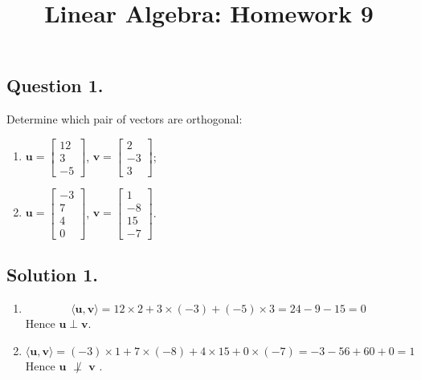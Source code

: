 \documentclass{article}
\title{Linear Algebra: Homework 9}
\begin{document}
\maketitle
\subsection*{Question 1.}
Determine which pair of vectors are orthogonal:
\begin{enumerate}[label=(\arabic*)]
    \item $\mathbf{u}=\left[\begin{array}{r}12\\3\\-5\end{array}\right]$, $\mathbf{v}=\left[\begin{array}{r}2\\-3\\3\end{array}\right]$; \item $\mathbf{u}=\left[\begin{array}{r}-3\\7\\4\\0\end{array}\right]$, $\mathbf{v}=\left[\begin{array}{r}1\\-8\\15\\-7\end{array}\right]$.
\end{enumerate}
\subsection*{Solution 1.}
\begin{enumerate} [label=(\arabic*)]
    \item \[\langle \mathbf{u},\mathbf{v}\rangle =12\times 2+3\times (-3)+(-5)\times 3=24-9-15=0\]
    Hence $\mathbf{u}\perp \mathbf{v}$.
    \item \[\langle \mathbf{u},\mathbf{v}\rangle =(-3)\times 1+7\times (-8)+4\times 15+0\times(-7)=-3-56+60+0=1\]
    Hence $\mathbf{u}$ $\not\perp$  $\mathbf{v}$ .
\end{enumerate}
\end{document}
